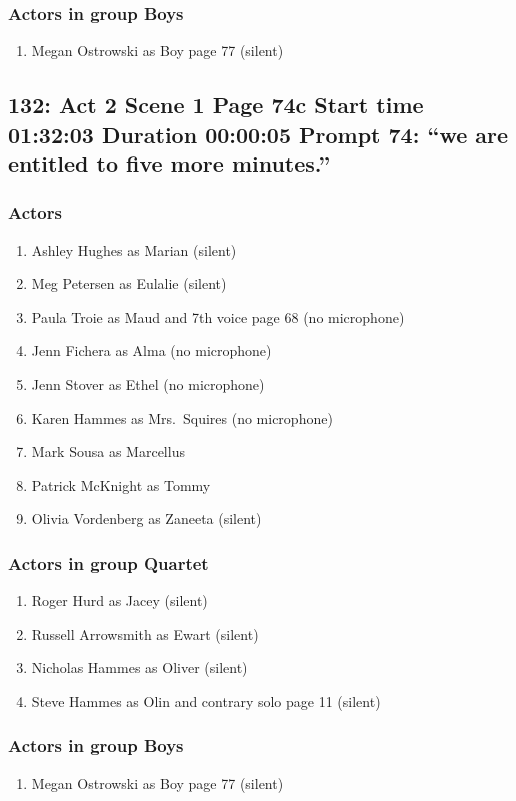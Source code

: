 \subsubsection{Actors in group Boys}
\begin{enumerate}
\item Megan Ostrowski as Boy page 77 (silent)
\end{enumerate}


\subsection{132: Act 2 Scene 1 Page 74c Start time 01:32:03 Duration 00:00:05 Prompt 74: ``we are entitled to five more minutes.''}

\subsubsection{Actors}
\begin{enumerate}
\item Ashley Hughes as Marian (silent)
\item Meg Petersen as Eulalie (silent)
\item Paula Troie as Maud and 7th voice page 68 (no microphone)
\item Jenn Fichera as Alma (no microphone)
\item Jenn Stover as Ethel (no microphone)
\item Karen Hammes as Mrs.~Squires (no microphone)
\item Mark Sousa as Marcellus
\item Patrick McKnight as Tommy
\item Olivia Vordenberg as Zaneeta (silent)
\end{enumerate}
\subsubsection{Actors in group Quartet}
\begin{enumerate}
\item Roger Hurd as Jacey (silent)
\item Russell Arrowsmith as Ewart (silent)
\item Nicholas Hammes as Oliver (silent)
\item Steve Hammes as Olin and contrary solo page 11 (silent)
\end{enumerate}
\subsubsection{Actors in group Boys}
\begin{enumerate}
\item Megan Ostrowski as Boy page 77 (silent)
\end{enumerate}


